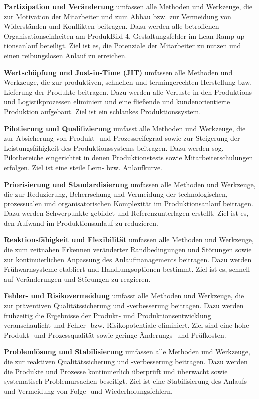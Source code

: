 \textbf{Partizipation und Veränderung} umfassen alle Methoden und Werkzeuge,
die zur Motivation der Mitarbeiter
und zum Abbau bzw. zur Vermeidung
von Widerständen und Konflikten beitragen. Dazu werden alle betroffenen
Organisationseinheiten am ProdukBild 4. Gestaltungsfelder im Lean Ramp-up
tionsanlauf beteiligt. Ziel ist es, die
Potenziale der Mitarbeiter zu nutzen
und einen reibungslosen Anlauf zu erreichen.

 \textbf{Wertschöpfung und Just-in-Time (JIT)}
umfassen alle Methoden und Werkzeuge, die zur produktiven, schnellen
und termingerechten Herstellung
bzw. Lieferung der Produkte beitragen. Dazu werden alle Verluste in den
Produktions- und Logistikprozessen
eliminiert und eine fließende und
kundenorientierte Produktion aufgebaut. Ziel ist ein schlankes Produktionssystem.

 \textbf{Pilotierung und Qualifizierung} umfasst
alle Methoden und Werkzeuge, die
zur Absicherung von Produkt- und
Prozessreifegrad sowie zur Steigerung der Leistungsfähigkeit des Produktionssystems beitragen. Dazu
werden sog. Pilotbereiche eingerichtet in denen Produktionstests sowie
Mitarbeiterschulungen erfolgen. Ziel
ist eine steile Lern- bzw. Anlaufkurve.

 \textbf{Priorisierung und Standardisierung}
umfassen alle Methoden und Werkzeuge, die zur Reduzierung, Beherrschung und Vermeidung der technologischen, prozessualen und organisatorischen Komplexität im Produktionsanlauf beitragen. Dazu werden
Schwerpunkte gebildet und Referenzunterlagen erstellt. Ziel ist es, den
Aufwand im Produktionsanlauf zu reduzieren.

 \textbf{Reaktionsfähigkeit und Flexibilität} umfassen alle Methoden und Werkzeuge,
die zum zeitnahen Erkennen veränderter Randbedingungen und Störungen sowie zur kontinuierlichen Anpassung des Anlaufmanagements beitragen. Dazu werden Frühwarnsysteme etabliert und Handlungsoptionen
bestimmt. Ziel ist es, schnell auf Veränderungen und Störungen zu reagieren.

 \textbf{Fehler- und Risikovermeidung} umfasst
alle Methoden und Werkzeuge, die
zur präventiven Qualitätssicherung
und -verbesserung beitragen. Dazu
werden frühzeitig die Ergebnisse der
Produkt- und Produktionsentwicklung veranschaulicht und Fehler- bzw.
Risikopotentiale eliminiert. Ziel sind
eine hohe Produkt- und Prozessqualität sowie geringe Änderungs- und
Prüfkosten.

 \textbf{Problemlösung und Stabilisierung} umfassen alle Methoden und Werkzeuge,
die zur reaktiven Qualitätssicherung
und -verbesserung beitragen. Dazu
werden die Produkte und Prozesse
kontinuierlich überprüft und überwacht sowie systematisch Problemursachen beseitigt. Ziel ist eine Stabilisierung des Anlaufs und Vermeidung
von Folge- und Wiederholungsfehlern.

